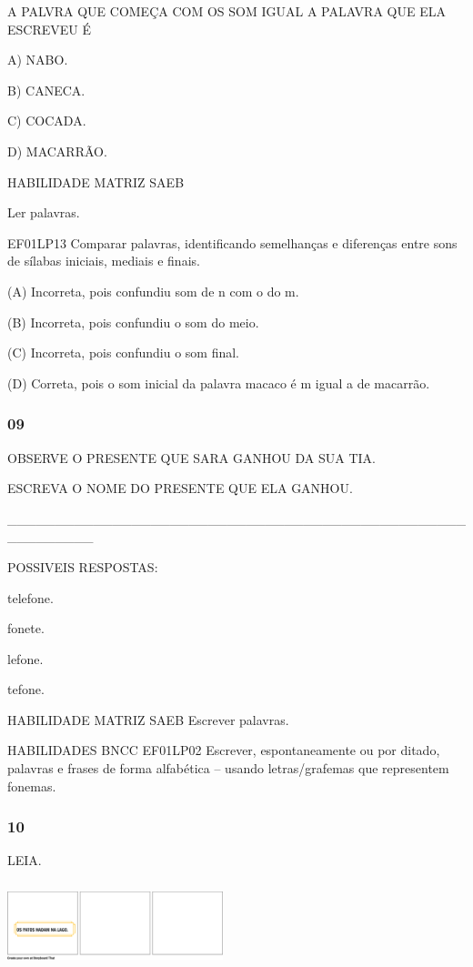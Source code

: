 \begin{escola}
A PALVRA QUE COMEÇA COM OS SOM IGUAL A PALAVRA QUE ELA ESCREVEU É

A) NABO.

B) CANECA.

C) COCADA.

D) MACARRÃO.

HABILIDADE MATRIZ SAEB

Ler palavras.

EF01LP13 Comparar palavras, identificando semelhanças e diferenças entre
sons de sílabas iniciais, mediais e finais.

(A) Incorreta, pois confundiu som de n com o do m.

(B) Incorreta, pois confundiu o som do meio.

(C) Incorreta, pois confundiu o som final.

(D) Correta, pois o som inicial da palavra macaco é m igual a de
macarrão.\protect\hypertarget{_heading=h.z3c8l2ojus6u}{}{}

\subsubsection{09}\label{section-81}

OBSERVE O PRESENTE QUE SARA GANHOU DA SUA TIA.

ESCREVA O NOME DO PRESENTE QUE ELA GANHOU.

\_\_\_\_\_\_\_\_\_\_\_\_\_\_\_\_\_\_\_\_\_\_\_\_\_\_\_\_\_\_\_\_\_\_\_\_\_\_\_\_\_\_\_\_\_\_\_\_\_\_\_\_\_\_\_\_\_

POSSIVEIS RESPOSTAS:

telefone.

fonete.

lefone.

tefone.

HABILIDADE MATRIZ SAEB Escrever palavras.

HABILIDADES BNCC EF01LP02 Escrever, espontaneamente ou por ditado,
palavras e frases de forma alfabética -- usando letras/grafemas que
representem fonemas.

\subsubsection{10}\label{section-82}

LEIA.

\includegraphics[width=2.46358in,height=0.98459in]{media/image249.png}


\end{escola}
